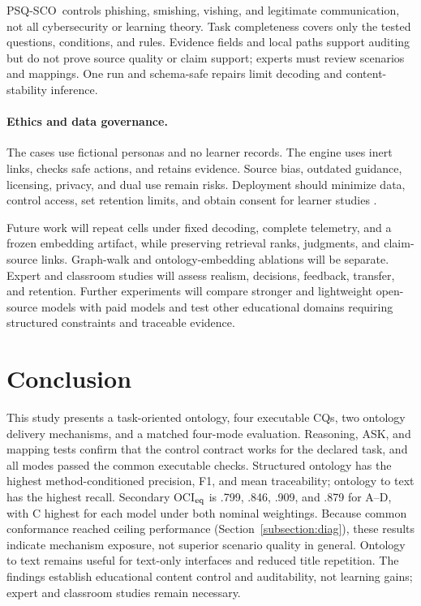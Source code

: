 \documentclass[runningheads]{llncs}
\newcommand{\sco}{PSQ-SCO}
\begin{document}
\sco\ controls phishing, smishing, vishing, and legitimate communication, not all
cybersecurity or learning theory. Task completeness covers only the tested
questions, conditions, and rules. Evidence fields and local paths support auditing but do not
prove source quality or claim support; experts must review scenarios and mappings. One run and schema-safe repairs limit decoding and content-stability inference.

\paragraph{Ethics and data governance.}
The cases use fictional personas and no learner records. The engine uses inert
links, checks safe actions, and retains evidence. Source bias, outdated guidance,
licensing, privacy, and dual use remain risks. Deployment should minimize data,
control access, set retention limits, and obtain consent for learner studies
\cite{pardo2014}.

Future work will repeat cells under fixed decoding, complete telemetry, and a
frozen embedding artifact, while preserving retrieval ranks, judgments, and
claim-source links. Graph-walk and ontology-embedding ablations will be separate.
Expert and classroom studies will assess realism, decisions, feedback, transfer,
and retention. Further experiments will compare stronger and lightweight
open-source models with paid models and test other educational domains requiring
structured constraints and traceable evidence.

\section{Conclusion}

This study presents a task-oriented ontology, four executable CQs, two ontology
delivery mechanisms, and a matched four-mode evaluation. Reasoning, ASK, and
mapping tests confirm that the control contract works for the declared task, and
all modes passed the common executable checks. Structured ontology has the highest method-conditioned precision, F1, and mean traceability; ontology to text has the highest recall. Secondary OCI$_{\rm eq}$ is .799, .846, .909, and .879 for A--D, with C highest for each model under both nominal weightings. Because common conformance reached ceiling performance (Section~\ref{subsection:diag}), these results indicate mechanism exposure, not superior scenario quality in general. Ontology to text remains useful for text-only interfaces and
reduced title repetition. The findings establish educational content control and
auditability, not learning gains; expert and classroom studies remain necessary.
\end{document}
